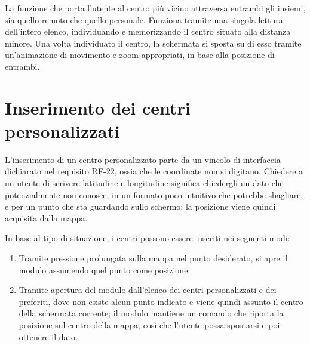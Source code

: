 La funzione che porta l'utente al centro più vicino attraversa entrambi gli insiemi, sia quello remoto che quello personale. %
Funziona tramite una singola lettura dell'intero elenco, individuando e memorizzando il centro situato alla distanza minore.
Una volta individuato il centro, la schermata si sposta su di esso tramite un'animazione di movimento e zoom appropriati,
in base alla posizione di entrambi.
%
%

\section{Inserimento dei centri personalizzati}\label{subsec:impl-validazione}

L'inserimento di un centro personalizzato parte da un vincolo di interfaccia dichiarato nel requisito RF-22, ossia che le coordinate non si digitano.
Chiedere a un utente di scrivere latitudine e longitudine significa chiedergli un dato che potenzialmente non conosce, in un formato poco intuitivo
che potrebbe sbagliare, e per un punto che sta guardando sullo schermo; la posizione viene quindi acquisita dalla mappa.

In base al tipo di situazione, i centri possono essere inseriti nei seguenti modi:

\begin{enumerate}
  \item Tramite pressione prolungata sulla mappa nel punto desiderato, si apre il modulo assumendo quel punto come posizione.%
  \item Tramite apertura del modulo dall'elenco dei centri personalizzati e dei preferiti, dove non esiste alcun punto indicato e viene quindi assunto
  il centro della schermata corrente; il modulo mantiene un comando che riporta la posizione sul centro della mappa, così che
  l'utente possa spostarsi e poi ottenere il dato.
\end{enumerate}


